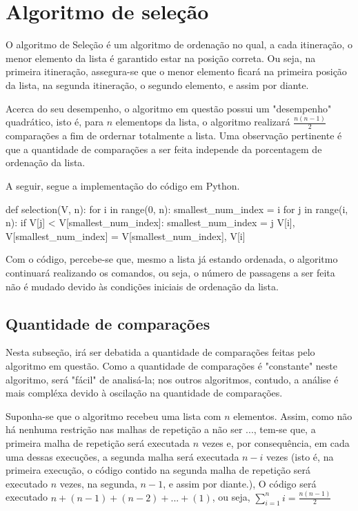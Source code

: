 \section{Algoritmo de seleção}
O algoritmo de Seleção é um algoritmo de ordenação no qual, a cada itineração, o menor elemento da lista é garantido estar na posição correta. Ou seja, na primeira itineração, assegura-se que o menor elemento ficará na primeira posição da lista, na segunda itineração, o segundo elemento, e assim por diante. 
\vspace{\baselineskip}

Acerca do seu desempenho, o algoritmo em questão possui um "desempenho" quadrático, isto é, para $n$ elementops da lista, o algoritmo realizará $\frac{n(n-1)}{2}$ comparações a fim de ordernar totalmente a lista. Uma observação pertinente é que a quantidade de comparações a ser feita independe da porcentagem de ordenação da lista.

A seguir, segue a implementação do código em Python.

\begin{python}
def selection(V, n):
    for i in range(0, n):
        smallest_num_index = i
        for j in range(i, n):
            if V[j] < V[smallest_num_index]:
                smallest_num_index = j
        V[i], V[smallest_num_index] = V[smallest_num_index], V[i]

\end{python}

Com o código, percebe-se que, mesmo a lista já estando ordenada, o algoritmo continuará realizando os comandos, ou seja, o número de passagens a ser feita não é mudado devido às condições iniciais de ordenação da lista.
\subsection*{Quantidade de comparações}
Nesta subseção, irá ser debatida a quantidade de comparações feitas pelo algoritmo em questão. Como a quantidade de comparações é "constante" neste algoritmo, será "fácil" de analisá-la; nos outros algoritmos, contudo, a análise é mais compléxa devido à oscilação na quantidade de comparações.

Suponha-se que o algoritmo recebeu uma lista com $n$ elementos. Assim, como não há nenhuma restrição nas malhas de repetição a não ser ..., tem-se que, a primeira malha de repetição será executada $n$ vezes e, por consequência, em cada uma dessas execuções, a segunda malha será executada $n-i$ vezes (isto é, na primeira execução, o código contido na segunda malha de repetição será executado $n$ vezes, na segunda, $n-1$, e assim por diante.), O código será executado $n+(n-1)+(n-2)+...+(1)$, ou seja, $\sum_{i=1}^n i = \frac{n(n-1)}{2}$
